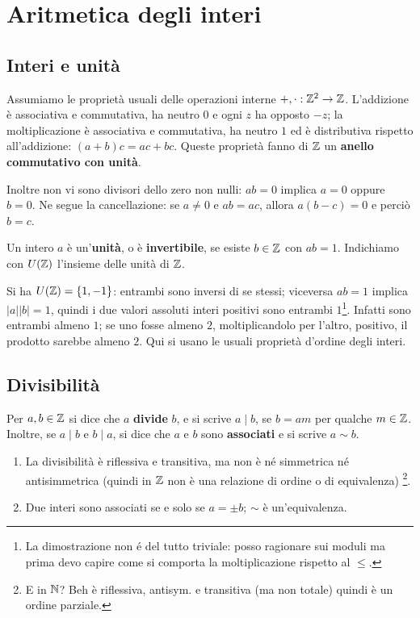 \chapter{Aritmetica degli interi}\label{cap:interi}

\section{Interi e unità}
Assumiamo le proprietà usuali delle operazioni interne $+,\cdot:\mathbb{Z}^2\to\mathbb{Z}$. L'addizione è associativa e commutativa, ha neutro $0$ e ogni $z$ ha opposto $-z$; la moltiplicazione è associativa e commutativa, ha neutro $1$ ed è distributiva rispetto all'addizione: $(a+b)c=ac+bc$. Queste proprietà fanno di $\mathbb{Z}$ un \textbf{anello commutativo con unità}.

Inoltre non vi sono divisori dello zero non nulli: $ab=0$ implica $a=0$ oppure $b=0$. Ne segue la cancellazione: se $a\ne0$ e $ab=ac$, allora $a(b-c)=0$ e perciò $b=c$.

\begin{definizione}
Un intero $a$ è un'\textbf{unità}, o è \textbf{invertibile}, se esiste $b\in\mathbb{Z}$ con $ab=1$. Indichiamo con $U(\mathbb{Z})$ l'insieme delle unità di $\mathbb{Z}$.
\end{definizione}

Si ha $U(\mathbb{Z})=\{1,-1\}$: entrambi sono inversi di se stessi; viceversa $ab=1$ implica $|a||b|=1$, quindi i due valori assoluti interi positivi sono entrambi $1$\footnote{La dimostrazione non é del tutto triviale: posso ragionare sui moduli ma prima devo capire come si comporta la moltiplicazione rispetto al $\leq$.}. Infatti sono entrambi almeno $1$; se uno fosse almeno $2$, moltiplicandolo per l'altro, positivo, il prodotto sarebbe almeno $2$. Qui si usano le usuali proprietà d'ordine degli interi.

\section{Divisibilità}
\begin{definizione}
Per $a,b\in\mathbb{Z}$ si dice che $a$ \textbf{divide} $b$, e si scrive $a\mid b$, se $b=am$ per qualche $m\in\mathbb{Z}$. Inoltre, se $a\mid b$ e $b\mid a$, si dice che $a$ e $b$ sono \textbf{associati} e si scrive $a\sim b$.
\end{definizione}

\begin{proposizione}
\begin{enumerate}[label=\arabic*.]
\item La divisibilità è riflessiva e transitiva, ma non è né simmetrica né antisimmetrica (quindi in $\mathbb{Z}$ non è una relazione di ordine o di equivalenza) \footnote{E in $\mathbb{N}$? Beh è riflessiva, antisym. e transitiva (ma non totale) quindi è un ordine parziale.}.
\item Due interi sono associati se e solo se $a=\pm b$; $\sim$ è un'equivalenza.
\end{enumerate}
\end{proposizione}

